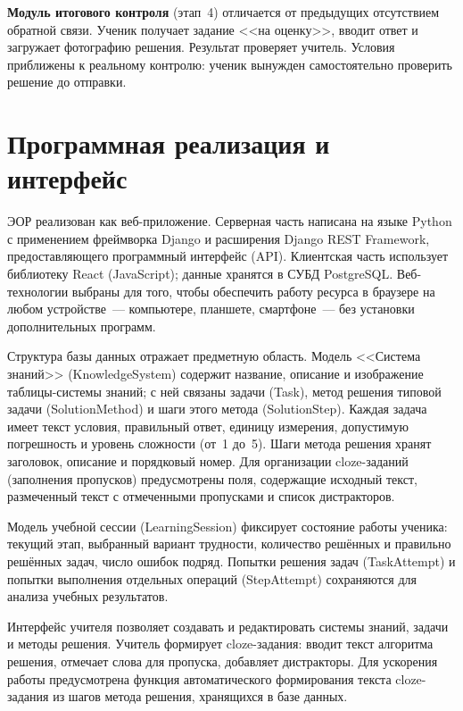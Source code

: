\documentclass[14pt]{extarticle}
\begin{document}
\textbf{Модуль итогового контроля} (этап~4) отличается от предыдущих
отсутствием обратной связи. Ученик получает задание <<на оценку>>, вводит
ответ и загружает фотографию решения. Результат проверяет учитель.
Условия приближены к реальному контролю: ученик вынужден самостоятельно
проверить решение до отправки.



\section{Программная реализация и интерфейс}

ЭОР реализован как веб-приложение. Серверная часть написана на
языке Python с применением фреймворка Django и расширения
Django REST Framework, предоставляющего программный интерфейс (API).
Клиентская часть использует библиотеку React (JavaScript);
данные хранятся в СУБД PostgreSQL. Веб-технологии выбраны
для того, чтобы обеспечить работу ресурса в браузере на любом
устройстве~--- компьютере, планшете, смартфоне~--- без установки
дополнительных программ.

Структура базы данных отражает предметную область.
Модель <<Система знаний>> (KnowledgeSystem) содержит название,
описание и изображение таблицы-системы знаний; с ней связаны задачи (Task),
метод решения типовой задачи (SolutionMethod) и шаги этого метода (SolutionStep).
Каждая задача имеет текст условия, правильный ответ, единицу измерения,
допустимую погрешность и уровень сложности (от~1 до~5). Шаги метода решения
хранят заголовок, описание и порядковый номер. Для организации cloze-заданий
(заполнения пропусков) предусмотрены поля, содержащие исходный текст,
размеченный текст с отмеченными пропусками и список дистракторов.

Модель учебной сессии (LearningSession) фиксирует состояние работы
ученика: текущий этап, выбранный вариант трудности, количество решённых
и правильно решённых задач, число ошибок подряд. Попытки решения задач
(TaskAttempt) и попытки выполнения отдельных операций (StepAttempt)
сохраняются для анализа учебных результатов.

Интерфейс учителя позволяет создавать и редактировать системы знаний,
задачи и методы решения. Учитель формирует cloze-задания:
вводит текст алгоритма решения, отмечает слова для пропуска,
добавляет дистракторы. Для ускорения работы предусмотрена
функция автоматического формирования текста cloze-задания из шагов
метода решения, хранящихся в базе данных.
\end{document}
